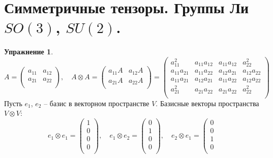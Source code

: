 \documentclass[12pt]{article}
\theoremstyle{definition}
\newtheorem{upr}[zad]{Упражнение}
\begin{document}
\section{Симметричные тензоры. Группы Ли $SO(3)$, $SU(2)$.}
\begin{upr}
\begin{equation}
    A=\left(
    \begin{array}{cc}
    a_{11} & a_{12}\\
    a_{21} & a_{22}\\ 
    \end{array}
    \right),\quad A\otimes A=\left(
    \begin{array}{cc}
    a_{11}A & a_{12}A\\
    a_{21}A & a_{22}A\\ 
    \end{array}
    \right)=\left(
    \begin{array}{cccc}
    a_{11}^2 & a_{11}a_{12} & a_{11}a_{12} & a_{22}^2\\
    a_{11}a_{21} & a_{11}a_{22} & a_{12}a_{21} & a_{12}a_{22}\\
    a_{11}a_{21} & a_{12}a_{21} & a_{11}a_{22} & a_{12}a_{22}\\
    a_{21}^2 & a_{21}a_{22} & a_{21}a_{22} & a_{22}^2\\
    \end{array}
    \right)
\end{equation}
Пусть $e_1$, $e_2$ -- базис в векторном пространстве $V$. Базисные векторы пространства $V\otimes V$:
\begin{equation}
    e_1\otimes e_1 = \left(
    \begin{array}{c}
    1\\
    0\\
    0\\
    0\\
    \end{array}
    \right),\quad e_1\otimes e_2=\left(
    \begin{array}{c}
    0\\
    1\\
    0\\
    0\\
    \end{array}
    \right),\quad e_2\otimes e_1=\left(
    \begin{array}{c}
    0\\
    0\\
    1\\
    0\\

\end{array}
\end{equation}
\end{upr}
\end{document}
